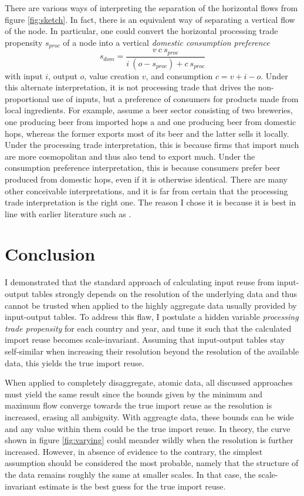 \documentclass[english]{uzhpub}
\begin{document}
There are various ways of interpreting the separation of the horizontal flows from figure \ref{fig:sketch}. In fact, there is an equivalent way of separating a vertical flow of the node. In particular, one could convert the horizontal processing trade propensity $s_{proc}$ of a node into a vertical \emph{domestic consumption preference} $$s_{dom} = \frac{v~c~s_{proc}}{i~(o-s_{proc}) + c~s_{proc}}$$ with input $i$, output $o$, value creation $v$, and consumption $c=v+i-o$. Under this alternate interpretation, it is not processing trade that drives the non-proportional use of inputs, but a preference of consumers for products made from local ingredients. For example, assume a beer sector consisting of two breweries, one producing beer from imported hops a and one producing beer from domestic hops, whereas the former exports most of its beer and the latter sells it locally. Under the processing trade interpretation, this is because firms that import much are more cosmopolitan and thus also tend to export much. Under the consumption preference interpretation, this is because consumers prefer beer produced from domestic hops, even if it is otherwise identical. There are many other conceivable interpretations, and it is far from certain that the processing trade interpretation is the right one. The reason I chose it is because it is best in line with earlier literature such as \cite{amiti2012importers}.

\section{Conclusion}
\label{sec:conclusion}
I demonstrated that the standard approach of calculating input reuse from input-output tables strongly depends on the resolution of the underlying data and thus cannot be trusted when applied to the highly aggregate data usually provided by input-output tables. To address this flaw, I postulate a hidden variable \emph{processing trade propensity} for each country and year, and tune it such that the calculated import reuse becomes scale-invariant. Assuming that input-output tables stay self-similar when increasing their resolution beyond the resolution of the available data, this yields the true import reuse.

When applied to completely disaggregate, atomic data, all discussed approaches must yield the same result since the bounds given by the minimum and maximum flow converge towards the true import reuse as the resolution is increased, erasing all ambiguity. With aggreagte data, these bounds can be wide and any value within them could be the true import reuse. In theory, the curve shown in figure \ref{fig:varying} could meander wildly when the resolution is further increased. However, in absence of evidence to the contrary, the simplest assumption should be considered the most probable, namely that the structure of the data remains roughly the same at smaller scales. In that case, the scale-invariant estimate is the best guess for the true import reuse.


\end{document}

